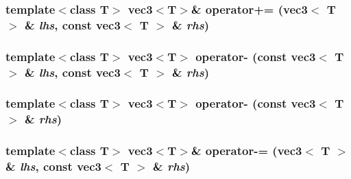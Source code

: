 \hypertarget{classnv_1_1vec3_303b24b77b45822f74d4a5fbcd5a9158}{
\subsubsection[{operator+=}]{\setlength{\rightskip}{0pt plus 5cm}template$<$class T$>$ {\bf vec3}$<$T$>$\& operator+= ({\bf vec3}$<$ T $>$ \& {\em lhs}, \/  const {\bf vec3}$<$ T $>$ \& {\em rhs})}}
\label{classnv_1_1vec3_303b24b77b45822f74d4a5fbcd5a9158}


\hypertarget{classnv_1_1vec3_f78147fab28f9a3a8c9edf28986e27da}{
\subsubsection[{operator-}]{\setlength{\rightskip}{0pt plus 5cm}template$<$class T$>$ {\bf vec3}$<$T$>$ operator- (const {\bf vec3}$<$ T $>$ \& {\em lhs}, \/  const {\bf vec3}$<$ T $>$ \& {\em rhs})}}
\label{classnv_1_1vec3_f78147fab28f9a3a8c9edf28986e27da}


\hypertarget{classnv_1_1vec3_40e1814c396466ba80b3f31e41508134}{
\subsubsection[{operator-}]{\setlength{\rightskip}{0pt plus 5cm}template$<$class T$>$ {\bf vec3}$<$T$>$ operator- (const {\bf vec3}$<$ T $>$ \& {\em rhs})}}
\label{classnv_1_1vec3_40e1814c396466ba80b3f31e41508134}


\hypertarget{classnv_1_1vec3_06765bb69def0a8d02cb1fa99dfe6d64}{
\subsubsection[{operator-=}]{\setlength{\rightskip}{0pt plus 5cm}template$<$class T$>$ {\bf vec3}$<$T$>$\& operator-= ({\bf vec3}$<$ T $>$ \& {\em lhs}, \/  const {\bf vec3}$<$ T $>$ \& {\em rhs})}}
\label{classnv_1_1vec3_06765bb69def0a8d02cb1fa99dfe6d64}


